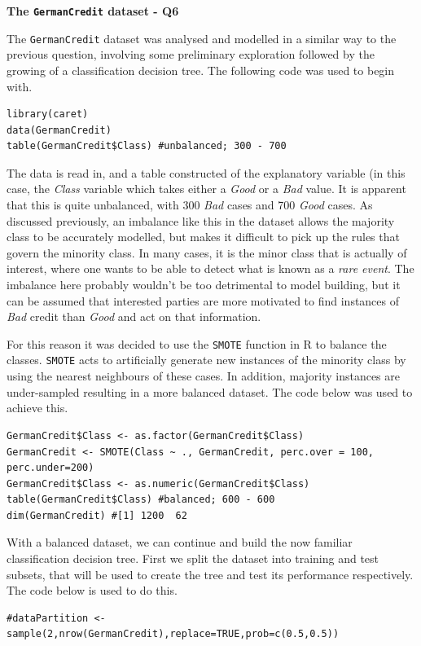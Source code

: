 \documentclass[paper=a4, fontsize=11pt]{scrartcl} %
\begin{document}
{\noindent \bf \Large The \texttt{GermanCredit} dataset - Q6}\\
{The \texttt{GermanCredit} dataset was analysed and modelled in a similar way to the previous question, involving some preliminary exploration followed by the growing of a classification decision tree. The following code was used to begin with. 
\begin{lstlisting}
library(caret)
data(GermanCredit)
table(GermanCredit$Class) #unbalanced; 300 - 700
\end{lstlisting}
\par{The data is read in, and a table constructed of the explanatory variable (in this case, the {\it Class} variable which takes either a {\it Good} or a {\it Bad} value. It is apparent that this is quite unbalanced, with 300 {\it Bad} cases and 700 {\it Good} cases. As discussed previously, an imbalance like this in the dataset allows the majority class to be accurately modelled, but makes it difficult to pick up the rules that govern the minority class. In many cases, it is the minor class that is actually of interest, where one wants to be able to detect what is known as a {\it rare event}. The imbalance here probably wouldn't be too detrimental to model building, but it can be assumed that interested parties are more motivated to find instances of {\it Bad} credit than {\it Good} and act on that information.} 
\par{For this reason it was decided to use the \texttt{SMOTE} function in R to balance the classes. \texttt{SMOTE} acts to artificially generate new instances of the minority class by using the nearest neighbours of these cases. In addition, majority instances are under-sampled resulting in a more balanced dataset. The code below was used to achieve this.
\begin{lstlisting}
GermanCredit$Class <- as.factor(GermanCredit$Class)
GermanCredit <- SMOTE(Class ~ ., GermanCredit, perc.over = 100, perc.under=200)
GermanCredit$Class <- as.numeric(GermanCredit$Class)
table(GermanCredit$Class) #balanced; 600 - 600
dim(GermanCredit) #[1] 1200  62
\end{lstlisting}}
\par {With a balanced dataset, we can continue and build the now familiar classification decision tree. First we split the dataset into training and test subsets, that will be used to create the tree and test its performance respectively. The code below is used to do this. \clearpage
\begin{lstlisting}
#dataPartition <- sample(2,nrow(GermanCredit),replace=TRUE,prob=c(0.5,0.5))

\end{lstlisting}}}
\end{document}
